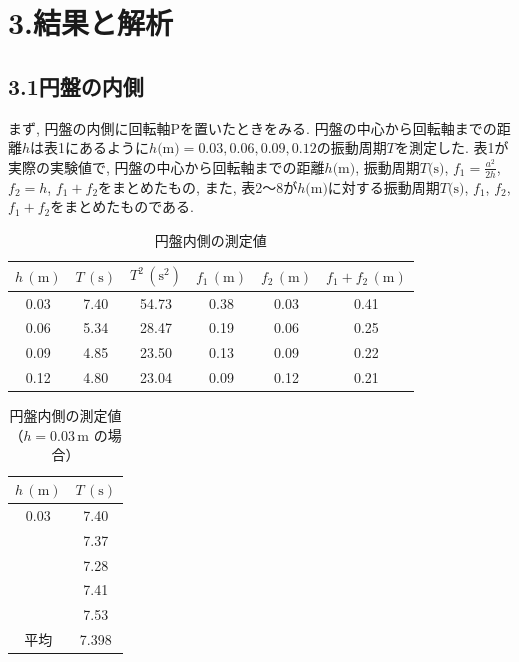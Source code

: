 \documentclass{jlreq}
\begin{document}
\section*{3.結果と解析}
\subsection*{3.1円盤の内側}
まず, 円盤の内側に回転軸Pを置いたときをみる. 円盤の中心から回転軸までの距離$h$は表1にあるように$h\text{(m)} = 0.03, 0.06, 0.09, 0.12$の振動周期$T$を測定した. 表1が実際の実験値で, 円盤の中心から回転軸までの距離$h\text{(m)}$, 振動周期$T\text{(s)}$, $f_1 = \frac{a^2}{2h}$, $f_2 = h$, $f_1+f_2$をまとめたもの, また, 表2〜8が$h\text{(m)}$に対する振動周期$T\text{(s)}$, $f_1$, $f_2$, $f_1+f_2$をまとめたものである.


\begin{table}[htbp]
  \centering
  \caption{円盤内側の測定値}
  \renewcommand{\arraystretch}{1.2} %
  \setlength{\tabcolsep}{6pt}       %
  \begin{tabular}{|c|c|c|c|c|c|}
    \hline
    $h\,(\mathrm{m})$ &
    $T\,(\mathrm{s})$ &
    $T^2\,(\mathrm{s}^2)$ &
    $f_1\,(\mathrm{m})$ &
    $f_2\,(\mathrm{m})$ &
    $f_1 + f_2\,(\mathrm{m})$ \\ \hline
    0.03 & 7.40 & 54.73 & 0.38 & 0.03 & 0.41 \\ \hline
    0.06 & 5.34 & 28.47 & 0.19 & 0.06 & 0.25 \\ \hline
    0.09 & 4.85 & 23.50 & 0.13 & 0.09 & 0.22 \\ \hline
    0.12 & 4.80 & 23.04 & 0.09 & 0.12 & 0.21 \\ \hline
  \end{tabular}
  \label{tab:disk_inner}
\end{table}




\begin{table}[htbp]
  \centering
  \caption{円盤内側の測定値（$h=0.03\,\mathrm{m}$ の場合）}
  \renewcommand{\arraystretch}{1.2} %
  \setlength{\tabcolsep}{6pt}       %
  \begin{tabular}{|c|c|}
    \hline
    \textbf{$h\,(\mathrm{m})$} & \textbf{$T\,(\mathrm{s})$} \\ \hline
    0.03 & 7.40 \\ \hline
         & 7.37 \\ \hline
         & 7.28 \\ \hline
         & 7.41 \\ \hline
         & 7.53 \\ \hline
    平均 & 7.398 \\ \hline
  \end{tabular}
  \label{tab:disk_inner_0.03}
\end{table}
\end{document}
